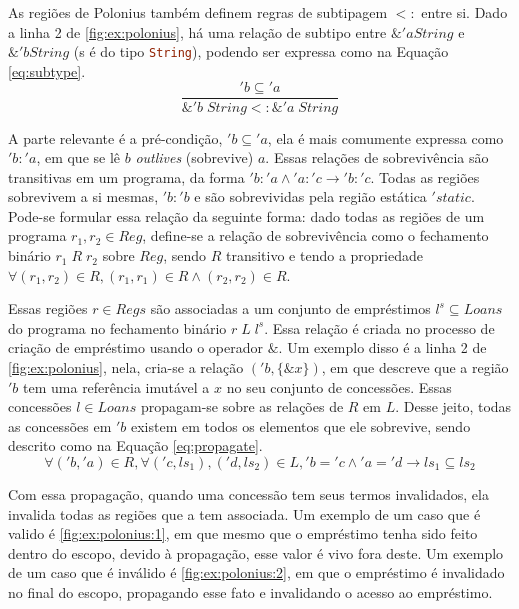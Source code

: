 As regiões de Polonius também definem regras de subtipagem $<:$ entre si. Dado a linha 2 de \ref{fig:ex:polonius}, há uma relação de subtipo entre $\&'a String$ e $\&'b String$ (s é do tipo \lstinline[language=Rust]|String|), podendo ser expressa como na Equação \ref{eq:subtype}.
\begin{equation}
	\frac{'b \subseteq {'a}}{\&'b\;String <: \&'a\;String}
	\label{eq:subtype}
\end{equation}


A parte relevante é a pré-condição, $'b \subseteq {'a}$, ela é mais comumente expressa como $'b : {'a}$, em que se lê $b$ \emph{outlives} (sobrevive) $a$. Essas relações de sobrevivência são transitivas em um programa, da forma $'b : {'a} \land {'a} : {'c} \to {'b} : {'c}$. Todas as regiões sobrevivem a si mesmas, ${'b} : {'b}$ e são sobrevividas pela região estática $'static$. Pode-se formular essa relação da seguinte forma: dado todas as regiões de um programa $r_1,r_2 \in Reg$, define-se a relação de sobrevivência como o fechamento binário $r_1\;R\;r_2$ sobre $Reg$, sendo $R$ transitivo e tendo a propriedade $\forall (r_1, r_2) \in R, (r_1, r_1) \in R \land (r_2, r_2) \in R$.

Essas regiões $r \in Regs$ são associadas a um conjunto de empréstimos $l^s \subseteq Loans$ do programa no fechamento binário $r\;L\;l^s$. Essa relação é criada no processo de criação de empréstimo usando o operador $\&$. Um exemplo disso é a linha 2 de \ref{fig:ex:polonius}, nela, cria-se a relação $('b, \{ \&x \})$, em que descreve que a região $'b$ tem uma referência imutável a $x$ no seu conjunto de concessões. Essas concessões $l \in Loans$ propagam-se sobre as relações de $R$ em $L$. Desse jeito, todas as concessões em $'b$ existem em todos os elementos que ele sobrevive, sendo descrito como na Equação \ref{eq:propagate}.
\begin{equation}
	\forall ('b, 'a) \in R, \forall ('c, ls_1), ('d, ls_2) \in L, {'b} = {'c} \land {'a} = {'d} \to ls_1 \subseteq ls_2 
	\label{eq:propagate}
\end{equation}

Com essa propagação, quando uma concessão tem seus termos invalidados, ela invalida todas as regiões que a tem associada. Um exemplo de um caso que é valido é \ref{fig:ex:polonius:1}, em que mesmo que o empréstimo tenha sido feito dentro do escopo, devido à propagação, esse valor é vivo fora deste. Um exemplo de um caso que é inválido é \ref{fig:ex:polonius:2}, em que o empréstimo é invalidado no final do escopo, propagando esse fato e invalidando o acesso ao empréstimo.

